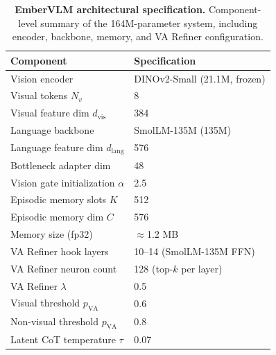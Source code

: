 \begin{table}[htbp]
\centering
\caption{\textbf{EmberVLM parameter breakdown.} Total: 164M parameters, 40M trainable.}
\label{tab:embervlm_params}
\end{table}

\begin{table}[htbp]
\centering
\caption{\textbf{EmberVLM architectural specification.} Component-level summary of the 164M-parameter system, including encoder, backbone, memory, and VA Refiner configuration.}
\label{tab:embervlm_arch_spec}
\begin{tabular}{ll}
\toprule
\textbf{Component} & \textbf{Specification} \\
\midrule
Vision encoder & DINOv2-Small (21.1M, frozen) \\
Visual tokens $N_v$ & 8 \\
Visual feature dim $d_{\text{vis}}$ & 384 \\
Language backbone & SmolLM-135M (135M) \\
Language feature dim $d_{\text{lang}}$ & 576 \\
Bottleneck adapter dim & 48 \\
Vision gate initialization $\alpha$ & 2.5 \\
Episodic memory slots $K$ & 512 \\
Episodic memory dim $C$ & 576 \\
Memory size (fp32) & $\approx$1.2 MB \\
VA Refiner hook layers & 10--14 (SmolLM-135M FFN) \\
VA Refiner neuron count & 128 (top-$k$ per layer) \\
VA Refiner $\lambda$ & 0.5 \\
Visual threshold $p_{\text{VA}}$ & 0.6 \\
Non-visual threshold $p_{\text{VA}}$ & 0.8 \\
Latent CoT temperature $\tau$ & 0.07 \\
\bottomrule
\end{tabular}
\end{table}

